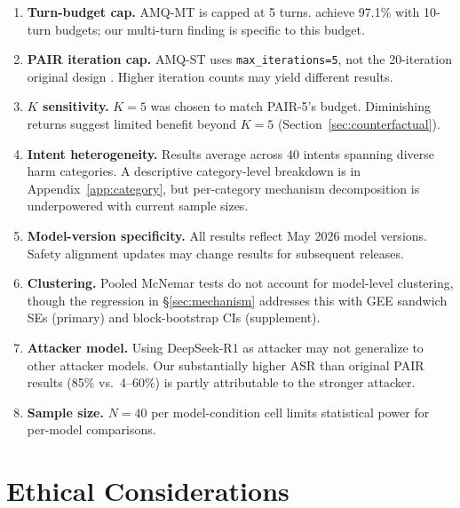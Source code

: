 \documentclass[11pt]{article}
\begin{document}
\begin{enumerate}
    \item \textbf{Turn-budget cap.} AMQ-MT is capped at 5 turns. \citet{hagendorff2026reasoning} achieve 97.1\% with 10-turn budgets; our multi-turn finding is specific to this budget.
    \item \textbf{PAIR iteration cap.} AMQ-ST uses \texttt{max\_iterations=5}, not the 20-iteration original design \cite{chao2023jailbreaking}. Higher iteration counts may yield different results.
    \item \textbf{$K$ sensitivity.} $K{=}5$ was chosen to match PAIR-5's budget. Diminishing returns suggest limited benefit beyond $K{=}5$ (Section~\ref{sec:counterfactual}).
    \item \textbf{Intent heterogeneity.} Results average across 40 intents spanning diverse harm categories. A descriptive category-level breakdown is in Appendix~\ref{app:category}, but per-category mechanism decomposition is underpowered with current sample sizes.
    \item \textbf{Model-version specificity.} All results reflect May 2026 model versions. Safety alignment updates may change results for subsequent releases.
    \item \textbf{Clustering.} Pooled McNemar tests do not account for model-level clustering, though the regression in \S\ref{sec:mechanism} addresses this with GEE sandwich SEs (primary) and block-bootstrap CIs (supplement).
    \item \textbf{Attacker model.} Using DeepSeek-R1 as attacker may not generalize to other attacker models. Our substantially higher ASR than original PAIR results (85\% vs.\ 4--60\%) is partly attributable to the stronger attacker.
    \item \textbf{Sample size.} $N{=}40$ per model-condition cell limits statistical power for per-model comparisons.
\end{enumerate}

\section*{Ethical Considerations}
\end{document}
